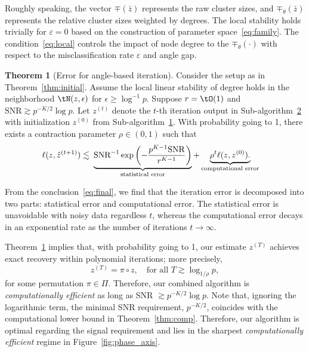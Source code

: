\documentclass[lettersize,onecolumn,journal]{IEEEtran}
\theoremstyle{definition}
\newtheorem{thm}{Theorem}
\theoremstyle{definition}
\newcommand{\of}[1]{\left(#1\right)}
\newcommand*{\KeepStyleUnderBrace}[1]{%
  \mathop{%
    \mathchoice
    {\underbrace{\displaystyle#1}}%
    {\underbrace{\textstyle#1}}%
    {\underbrace{\scriptstyle#1}}%
    {\underbrace{\scriptscriptstyle#1}}%
  }\limits
}
\begin{document}
Roughly speaking, the vector $\mp(\bar z)$ represents the raw cluster sizes, and $\mp_{\theta}(\bar z)$ represents the relative cluster sizes weighted by degrees. 
The local stability holds trivially for $\varepsilon=0$ based on the construction of parameter space~\eqref{eq:family}. The condition~\eqref{eq:local} controls the impact of node degree to the $\mp_{\theta}(\cdot)$ with respect to the misclassification rate $\varepsilon$ and angle gap.
 
\begin{thm}[Error for angle-based iteration]\label{thm:refinement} Consider the setup as in Theorem~\ref{thm:initial}. Assume the local linear stability of degree holds in the neighborhood $\tN(z,\epsilon)$ for $\epsilon \geq \log^{-1}p$. Suppose 
$r=\tO(1)$ and $\text{SNR} \gtrsim  p^{-K/2}\log p$. Let $z^{(t)}$ denote the $t$-th iteration output in Sub-algorithm~\hyperref[alg:main]{2} with initialization $z^{(0)}$ from Sub-algorithm~\hyperref[alg:main]{1}. With probability going to 1, there exists a contraction parameter $\rho \in (0,1)$ such that 
\begin{align}\label{eq:final}
    \ell(z, \hat z^{(t+1)}) \lesssim &\ \KeepStyleUnderBrace{
   \text{SNR}^{-1}
    \exp\of{- \frac{p^{K-1}\text{SNR}}{r^{K-1}}}}_{\substack{\text{statistical error}} }+ \KeepStyleUnderBrace{ \rho^t \ell(z, z^{(0)}). }_{\substack{\text{computational error}}}
\end{align}
\end{thm}
From the conclusion~\eqref{eq:final}, we find that the iteration error is decomposed into two parts: statistical error and computational error. The statistical error is unavoidable with noisy data regardless $t$, whereas the computational error decays in an exponential rate as the number of iterations $t \rightarrow \infty$. 

Theorem~\ref{thm:refinement} implies that, with probability going to 1, our estimate $z^{(T)}$ achieves exact recovery within polynomial iterations; more precisely,
\begin{equation}
     z^{(T)} = \pi \circ z, \quad \text{for all }T\gtrsim \log_{1/\rho} p,
\end{equation}
for some permutation $\pi \in \Pi$. Therefore, our combined algorithm is \textit{computationally efficient} as long as SNR $\gtrsim p^{-K/2} \log p$. Note that, ignoring the logarithmic term, the minimal SNR requirement, $p^{-K/2}$, coincides with the computational lower bound in Theorem~\ref{thm:comp}. Therefore, our algorithm is optimal regarding the signal requirement and lies in the sharpest \emph{computationally efficient} regime in Figure~\ref{fig:phase_axis}.
\end{document}

